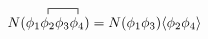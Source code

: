 \documentclass[12pt]{standalone}
\begin{document}
\begin{equation*}
    N(
        \contraction[1ex]{\phi_1}{\phi_2}{\phi_3}{\phi_4}
        \phi_1 \phi_2 \phi_3 \phi_4
    )
    = 
    N(\phi_1 \phi_3) \langle \phi_2 \phi_4 \rangle
\end{equation*}
\end{document}
